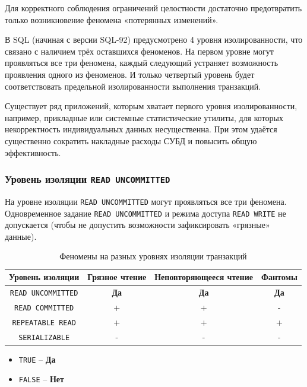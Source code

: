 \documentclass[a4paper,12pt]{article}
\begin{document}
Для корректного соблюдения ограничений целостности достаточно предотвратить только возникновение феномена «потерянных изменений».

В SQL (начиная с версии SQL-92) предусмотрено 4 уровня изолированности, что связано с наличием трёх оставшихся феноменов. На первом уровне могут проявляться все три феномена, каждый следующий устраняет возможность проявления одного из феноменов. И только четвертый уровень будет соответствовать предельной изолированности выполнения транзакций.

Существует ряд приложений, которым хватает первого уровня изолированности, например, прикладные или системные статистические утилиты, для которых некорректность индивидуальных данных несущественна. При этом удаётся существенно сократить накладные расходы СУБД и повысить общую эффективность.

\subsubsection{Уровень изоляции \texttt{READ UNCOMMITTED}}

На уровне изоляции \texttt{READ UNCOMMITTED} могут проявляться все три феномена. Одновременное задание \texttt{READ UNCOMMITTED} и режима доступа \texttt{READ WRITE} не допускается (чтобы не допустить возможности зафиксировать «грязные» данные).

\begin{table}[h!]
    \centering
    \begin{tabular}{|c|c|c|c|}
        \hline
        \textbf{Уровень изоляции} & \textbf{Грязное чтение} & \textbf{Неповторяющееся чтение} & \textbf{Фантомы} \\
        \hline
        \texttt{READ UNCOMMITTED} & \textbf{Да} & \textbf{Да} & \textbf{Да} \\
        \texttt{READ COMMITTED} & + & + & - \\
        \texttt{REPEATABLE READ} & + & + & + \\
        \texttt{SERIALIZABLE} & - & - & - \\
        \hline
    \end{tabular}
    \caption{Феномены на разных уровнях изоляции транзакций}
\end{table}

\begin{itemize}
    \item \texttt{TRUE} – \textbf{Да}
    \item \texttt{FALSE} – \textbf{Нет}
\end{itemize}
\end{document}
